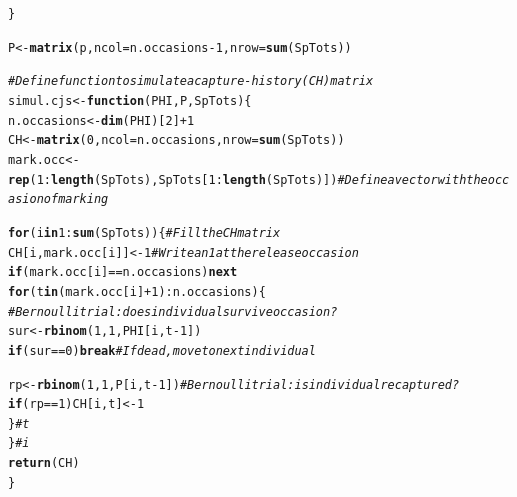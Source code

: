 \documentclass[a4paper, 10pt]{scrartcl}\usepackage[]{graphicx}\usepackage[]{color}
\makeatletter
\newcommand{\hlnum}[1]{\textcolor[rgb]{0.686,0.059,0.569}{#1}}%
\newcommand{\hlcom}[1]{\textcolor[rgb]{0.678,0.584,0.686}{\textit{#1}}}%
\newcommand{\hlopt}[1]{\textcolor[rgb]{0,0,0}{#1}}%
\newcommand{\hlstd}[1]{\textcolor[rgb]{0.345,0.345,0.345}{#1}}%
\newcommand{\hlkwa}[1]{\textcolor[rgb]{0.161,0.373,0.58}{\textbf{#1}}}%
\newcommand{\hlkwb}[1]{\textcolor[rgb]{0.69,0.353,0.396}{#1}}%
\newcommand{\hlkwc}[1]{\textcolor[rgb]{0.333,0.667,0.333}{#1}}%
\newcommand{\hlkwd}[1]{\textcolor[rgb]{0.737,0.353,0.396}{\textbf{#1}}}%
\newenvironment{kframe}{%
 \def\at@end@of@kframe{}%
 \ifinner\ifhmode%
  \def\at@end@of@kframe{\end{minipage}}%
  \begin{minipage}{\columnwidth}%
 \fi\fi%
 \def\FrameCommand##1{\hskip\@totalleftmargin \hskip-\fboxsep
 \colorbox{shadecolor}{##1}\hskip-\fboxsep
     \hskip-\linewidth \hskip-\@totalleftmargin \hskip\columnwidth}%
 \MakeFramed {\advance\hsize-\width
   \@totalleftmargin\z@ \linewidth\hsize
   \@setminipage}}%
 {\par\unskip\endMakeFramed%
 \at@end@of@kframe}
\newenvironment{knitrout}{}{} %
\makeatother
\begin{document}
\begin{knitrout}
\begin{kframe}
\begin{alltt}
\hlstd{\}}

\hlstd{P} \hlkwb{<-} \hlkwd{matrix}\hlstd{(p,} \hlkwc{ncol} \hlstd{= n.occasions}\hlopt{-}\hlnum{1}\hlstd{,} \hlkwc{nrow} \hlstd{=} \hlkwd{sum}\hlstd{(SpTots))}
\end{alltt}
\end{kframe}
\end{knitrout}

\begin{knitrout}
\color{fgcolor}\begin{kframe}
\begin{alltt}
\hlcom{# Define function to simulate a capture-history (CH) matrix}
\hlstd{simul.cjs} \hlkwb{<-} \hlkwa{function}\hlstd{(}\hlkwc{PHI}\hlstd{,} \hlkwc{P}\hlstd{,} \hlkwc{SpTots}\hlstd{)\{}
  \hlstd{n.occasions} \hlkwb{<-} \hlkwd{dim}\hlstd{(PHI)[}\hlnum{2}\hlstd{]} \hlopt{+} \hlnum{1}
  \hlstd{CH} \hlkwb{<-} \hlkwd{matrix}\hlstd{(}\hlnum{0}\hlstd{,} \hlkwc{ncol} \hlstd{= n.occasions,} \hlkwc{nrow} \hlstd{=} \hlkwd{sum}\hlstd{(SpTots))}
  \hlstd{mark.occ} \hlkwb{<-} \hlkwd{rep}\hlstd{(}\hlnum{1}\hlopt{:}\hlkwd{length}\hlstd{(SpTots), SpTots[}\hlnum{1}\hlopt{:}\hlkwd{length}\hlstd{(SpTots)])}  \hlcom{# Define a vector with the occasion of marking}

  \hlkwa{for} \hlstd{(i} \hlkwa{in} \hlnum{1}\hlopt{:}\hlkwd{sum}\hlstd{(SpTots))\{}\hlcom{# Fill the CH matrix}
    \hlstd{CH[i, mark.occ[i]]} \hlkwb{<-} \hlnum{1}       \hlcom{# Write an 1 at the release occasion}
    \hlkwa{if} \hlstd{(mark.occ[i]}\hlopt{==}\hlstd{n.occasions)} \hlkwa{next}
    \hlkwa{for} \hlstd{(t} \hlkwa{in} \hlstd{(mark.occ[i]}\hlopt{+}\hlnum{1}\hlstd{)}\hlopt{:}\hlstd{n.occasions)\{}
      \hlcom{# Bernoulli trial: does individual survive occasion?}
      \hlstd{sur} \hlkwb{<-} \hlkwd{rbinom}\hlstd{(}\hlnum{1}\hlstd{,} \hlnum{1}\hlstd{, PHI[i,t}\hlopt{-}\hlnum{1}\hlstd{])}
      \hlkwa{if} \hlstd{(sur}\hlopt{==}\hlnum{0}\hlstd{)} \hlkwa{break}         \hlcom{# If dead, move to next individual }

      \hlstd{rp} \hlkwb{<-} \hlkwd{rbinom}\hlstd{(}\hlnum{1}\hlstd{,} \hlnum{1}\hlstd{, P[i,t}\hlopt{-}\hlnum{1}\hlstd{])}\hlcom{# Bernoulli trial: is individual recaptured? }
      \hlkwa{if} \hlstd{(rp}\hlopt{==}\hlnum{1}\hlstd{) CH[i,t]} \hlkwb{<-} \hlnum{1}
    \hlstd{\}} \hlcom{#t}
  \hlstd{\}} \hlcom{#i}
  \hlkwd{return}\hlstd{(CH)}
\hlstd{\}}
\end{alltt}
\end{kframe}
\end{knitrout}
\end{document}
